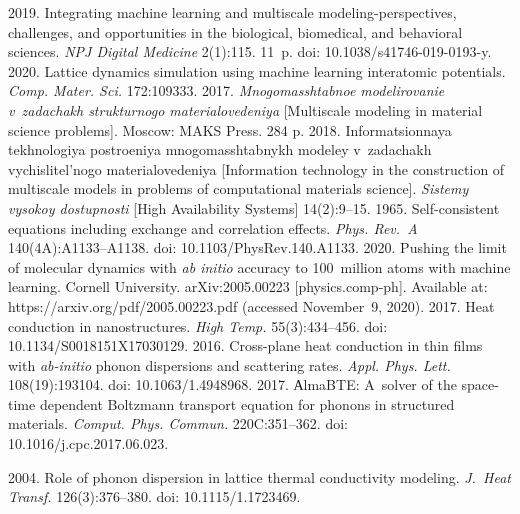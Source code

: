\begin{multicols}{2}
{{\begin{thebibliography}{99}
   2019. Integrating machine learning and 
multiscale modeling-perspectives, challenges, and opportunities in the biological, biomedical, and behavioral 
sciences. \textit{NPJ Digital Medicine} 2(1):115. 11~p. doi: 10.1038/s41746-019-0193-y.
 2020. Lattice dynamics simulation using 
machine learning interatomic potentials. \textit{Comp. Mater. Sci.} 172:109333.
 2017. \textit{Mnogomasshtabnoe modelirovanie v~zadachakh strukturnogo 
materialovedeniya} [Multiscale modeling in material science problems]. Moscow: MAKS Press. 284 p.
   2018. Informatsionnaya tekhnologiya postroeniya mnogomasshtabnykh modeley 
v~zadachakh vychislitel'nogo materialovedeniya [Information technology in the construction of multiscale models 
in problems of computational materials science]. \textit{Sistemy vysokoy do\-stup\-nosti} [High Availability 
Systems] 14(2):9--15.
   1965. Self-consistent equations including exchange and correlation 
effects. \textit{Phys. Rev.~A} 140(4A):A1133--A1138. doi: 10.1103/\mbox{PhysRev}.140.A1133.
   2020. Pushing the limit of molecular dynamics with 
  \textit{ab initio} 
accuracy to 100~million atoms with machine learning. 
Cornell University. arXiv:2005.00223 [physics.comp-ph]. Available at: {\sf 
https://arxiv.org/pdf/2005.00223.pdf} (accessed November~9, 2020).
   2017. Heat 
conduction in nanostructures. \textit{High 
Temp.} 55(3):434--456. doi: 10.1134/S0018151X17030129.
   2016. Cross-plane heat conduction in thin films with 
  \textit{ab-initio} phonon dispersions and scattering rates. \textit{Appl. Phys. Lett.} 108(19):193104. doi: 
10.1063/1.4948968.
2017. АlmaBTE: A~solver of the space-time dependent Boltzmann transport equation for phonons in structured 
materials. \textit{Comput. Phys. Commun.} 220C:351--362. doi: 10.1016/j.cpc.2017.06.023.

   2004. Role of phonon dispersion in lattice 
thermal conductivity modeling. \textit{J.~Heat Transf.} 126(3):376--380. doi: 10.1115/1.1723469.


\end{thebibliography}}}
\end{multicols}
